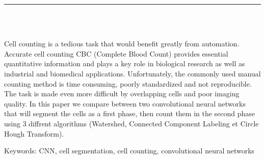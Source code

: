 \vspace*{0.2in}

\thispagestyle{empty}

\begin{center}
    {\color{Black} \rule{3in}{1.4mm} }\\
    \vspace{0.1in}
    \scshape{\fontsize{34}{46}{\bfseries{\color{Black}{Abstract}}}}
    \\
    \vspace{0.6in}
\end{center}
\hspace{\parindent}
\begin{changemargin}{0.9cm}{0.9cm}

Cell counting is a tedious task that would benefit greatly from automation. Accurate cell counting CBC (Complete Blood Count) provides essential quantitative information and plays a key role in biological research as well as industrial and biomedical applications. Unfortunately, the commonly used manual counting method is time consuming, poorly standardized and not reproducible. The task is made even more difficult by overlapping cells and poor imaging quality. In this paper we compare between two convolutional neural networks that will segment the cells as a first phase, then count them in the second phase using 3 diffrent algorithms (Watershed, Connected Component Labeling et Circle Hough Transform).

\end{changemargin}

\vspace{1in}

\begin{changemargin}{0.9cm}{0.9cm}
\hspace{-\parindent}
Keywords: CNN, cell segmentation, cell counting, convolutional neural networks
\end{changemargin}
